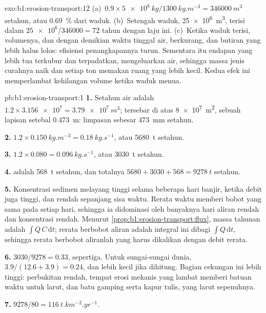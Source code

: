\begin{solution}{exo:b1:erosion-transport:12}
(a)~$0.9 \times \qty{5e8}{kg}/\qty{1300}{kg.m^{-3}} = \qty{346000}{m^3}$ setahun,
atau \qty{0.69}{\percent} dari waduk. (b)~Setengah waduk, \qty{25e6}{m^3}, terisi dalam
$\num{25e6}/\num{346000} = \num{72}\text{ tahun}$ dengan laju ini. (c)~Ketika waduk
terisi, volumenya, dan dengan demikian waktu tinggal air, berkurang, dan butiran yang
lebih halus lolos: efisiensi penangkapannya turun. Sementara itu endapan yang lebih
tua terkubur dan terpadatkan, mengeluarkan air, sehingga massa jenis curahnya naik dan
setiap ton memakan ruang yang lebih kecil. Kedua efek ini memperlambat kehilangan
volume ketika waduk menua.
\end{solution}

\begin{solution}{pb:b1:erosion-transport:1}
\textbf{1.} Setahun air adalah $1.2 \times \num{3.156e7} = \qty{3.79e7}{m^3}$;
tersebar di atas \qty{8e7}{m^2}, sebuah lapisan setebal \qty{0.473}{m}: limpasan
sebesar \qty{473}{mm} setahun.

\textbf{2.} $1.2 \times \qty{0.150}{kg.m^{-3}} = \qty{0.18}{kg.s^{-1}}$, atau
\qty{5680}{t} setahun.

\textbf{3.} $1.2 \times 0.080 = \qty{0.096}{kg.s^{-1}}$, atau \qty{3030}{t} setahun.

\textbf{4.}  adalah \qty{568}{t} setahun, dan totalnya $5680 + 3030 +
568 = \qty{9278}{t}$ setahun.

\textbf{5.} Konsentrasi sedimen melayang tinggi selama beberapa hari banjir, ketika
debit juga tinggi, dan rendah sepanjang sisa waktu. Rerata waktu memberi bobot yang
sama pada setiap hari, sehingga ia didominasi oleh banyaknya hari aliran rendah dan
konsentrasi rendah. Menurut \cref{prop:b1:erosion-transport:flux}, massa tahunan
adalah $\int Q\,C\,\mathrm dt$; rerata berbobot aliran adalah integral ini dibagi
$\int Q\,\mathrm dt$, sehingga rerata berbobot aliranlah yang harus dikalikan dengan
debit rerata.

\textbf{6.} $3030/9278 = \num{0.33}$, sepertiga. Untuk sungai-sungai dunia,
$3.9/(12.6 + 3.9) = \num{0.24}$, dan lebih kecil jika  dihitung.
Bagian cekungan ini lebih tinggi: perbukitan rendah, tempat erosi mekanis yang lambat
memberi batuan waktu untuk larut, dan batu gamping serta kapur tulis, yang larut sepenuhnya.

\textbf{7.} $9278/80 = \qty{116}{t.km^{-2}.yr^{-1}}$.


\end{solution}
